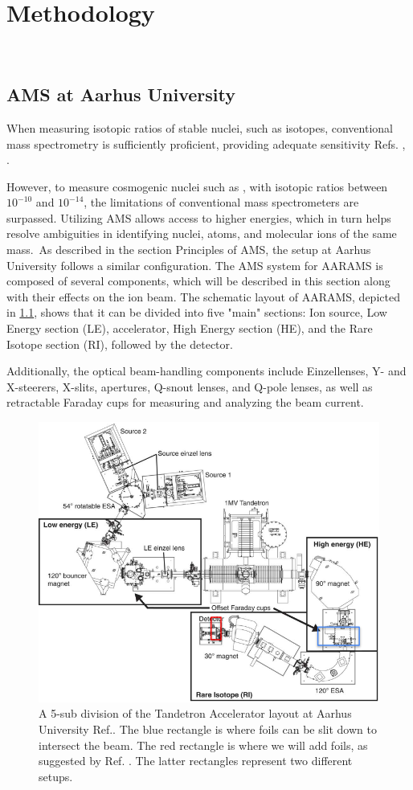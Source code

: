 \chapter{Methodology}\
\section{AMS at Aarhus University}
When measuring isotopic ratios of stable nuclei, such as isotopes, conventional mass spectrometry is sufficiently proficient, providing adequate sensitivity Refs. \cite{steinhof2016}, \cite{tuniz1998ams}.

However, to measure cosmogenic nuclei such as , with isotopic ratios between $10^{-10}$ and $10^{-14}$, the limitations of conventional mass spectrometers are surpassed. Utilizing AMS allows access to higher energies, which in turn helps resolve ambiguities in identifying nuclei, atoms, and molecular ions of the same mass.\ As described in the section Principles of AMS, the setup at Aarhus University follows a similar configuration. The AMS system for AARAMS is composed of several components, which will be described in this section along with their effects on the ion beam. The schematic layout of AARAMS, depicted in  \cref{fig:AuAMS}, shows that it can be divided into five "main" sections: Ion source, Low Energy section (LE),  accelerator, High Energy section (HE), and the Rare Isotope section (RI), followed by the detector.

Additionally, the optical beam-handling components include Einzellenses, Y- and X-steerers, X-slits, apertures, Q-snout lenses, and Q-pole lenses, as well as retractable Faraday cups for measuring and analyzing the beam current.

\begin{figure}
    \centering
    \includegraphics[width=\textwidth]{B/AarhusAMSTecDraw.PNG}
    \caption{A 5-sub division of the  Tandetron Accelerator layout at Aarhus University Ref.\cite{olsen2017}. The blue rectangle is where foils can be slit down to intersect the beam. The red rectangle is where we will add  foils, as suggested by Ref. \cite{steier2019}. The latter rectangles represent two different setups.} 
    \label{fig:AuAMS}
\end{figure}


